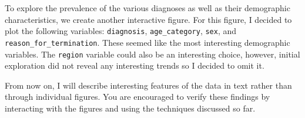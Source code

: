 \documentclass[
]{book}
\newenvironment{Shaded}{\begin{snugshade}}{\end{snugshade}}
\newcommand{\AttributeTok}[1]{\textcolor[rgb]{0.13,0.29,0.53}{#1}}
\newcommand{\CommentTok}[1]{\textcolor[rgb]{0.56,0.35,0.01}{\textit{#1}}}
\newcommand{\FunctionTok}[1]{\textcolor[rgb]{0.13,0.29,0.53}{\textbf{#1}}}
\newcommand{\NormalTok}[1]{#1}
\newcommand{\OtherTok}[1]{\textcolor[rgb]{0.56,0.35,0.01}{#1}}
\newcommand{\SpecialCharTok}[1]{\textcolor[rgb]{0.81,0.36,0.00}{\textbf{#1}}}
\newcommand{\StringTok}[1]{\textcolor[rgb]{0.31,0.60,0.02}{#1}}
\theoremstyle{definition}
\theoremstyle{definition}
\theoremstyle{definition}
\theoremstyle{definition}
\theoremstyle{remark}
\begin{document}
To explore the prevalence of the various diagnoses as well as their demographic characteristics, we create another interactive figure. For this figure, I decided to plot the following variables: \texttt{diagnosis}, \texttt{age\_category}, \texttt{sex}, and \texttt{reason\_for\_termination}. These seemed like the most interesting demographic variables. The \texttt{region} variable could also be an interesting choice, however, initial exploration did not reveal any interesting trends so I decided to omit it.

From now on, I will describe interesting features of the data in text rather than through individual figures. You are encouraged to verify these findings by interacting with the figures and using the techniques discussed so far.

\begin{Shaded}
\end{Shaded}
\end{document}
